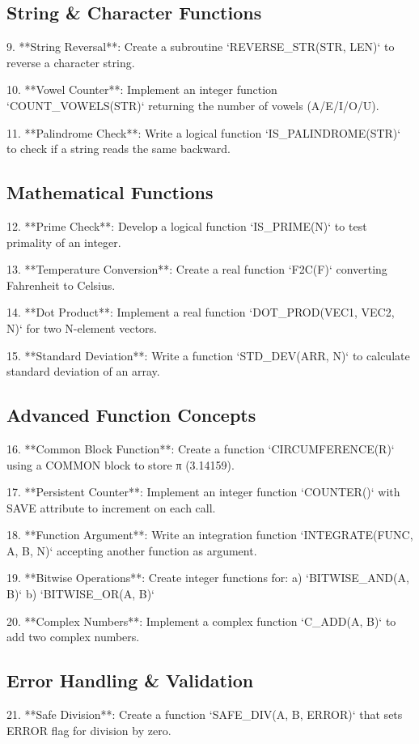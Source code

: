 \documentclass{book}
\begin{document}
\subsection*{String \& Character Functions}  
9. **String Reversal**:  
Create a subroutine `REVERSE_STR(STR, LEN)` to reverse a character string.  

10. **Vowel Counter**:  
Implement an integer function `COUNT_VOWELS(STR)` returning the number of vowels (A/E/I/O/U).  

11. **Palindrome Check**:  
Write a logical function `IS_PALINDROME(STR)` to check if a string reads the same backward.  

\subsection*{Mathematical Functions}  
12. **Prime Check**:  
Develop a logical function `IS_PRIME(N)` to test primality of an integer.  

13. **Temperature Conversion**:  
Create a real function `F2C(F)` converting Fahrenheit to Celsius.  

14. **Dot Product**:  
Implement a real function `DOT_PROD(VEC1, VEC2, N)` for two N-element vectors.  

15. **Standard Deviation**:  
Write a function `STD_DEV(ARR, N)` to calculate standard deviation of an array.  

\subsection*{Advanced Function Concepts}  
16. **Common Block Function**:  
Create a function `CIRCUMFERENCE(R)` using a COMMON block to store π (3.14159).  

17. **Persistent Counter**:  
Implement an integer function `COUNTER()` with SAVE attribute to increment on each call.  

18. **Function Argument**:  
Write an integration function `INTEGRATE(FUNC, A, B, N)` accepting another function as argument.  

19. **Bitwise Operations**:  
Create integer functions for:  
a) `BITWISE_AND(A, B)`  
b) `BITWISE_OR(A, B)`  

20. **Complex Numbers**:  
Implement a complex function `C_ADD(A, B)` to add two complex numbers.  

\subsection*{Error Handling \& Validation}  
21. **Safe Division**:  
Create a function `SAFE_DIV(A, B, ERROR)` that sets ERROR flag for division by zero.  
\end{document}
